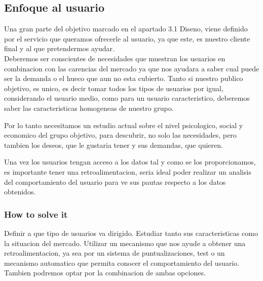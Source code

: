 \subsection{Enfoque al usuario}
Una gran parte del objetivo marcado en el apartado 3.1 Diseno, viene definido por el servicio que queramos ofrecerle
al usuario, ya que este, es nuestro cliente final y al que pretendermos ayudar.\\


Deberemos ser conscientes de necesidades que muestran los usuarios en combinacion con las carencias del mercado ya que
nos ayudara a saber cual puede ser la demanda o el hueco que aun no esta cubierto.
Tanto si nuestro publico objetivo, es unico, es decir tomar todos los tipos de usuarios por igual, considerando el 
usuario medio, como para un usuario caracteristico, deberemos saber las caracteristicas homogeneas de nuestro grupo.

Por lo tanto necesitamos un estudio actual sobre el nivel psicologico, social y economico del grupo objetivo, para descubrir, no solo
las necesidades, pero tambien los deseos, que le gustaria tener y sus demandas, que quieren.

Una vez los usuarios tengan acceso a los datos tal y como se los proporcionamos, es importante tener una retroalimentacion, 
seria ideal poder realizar un analisis del comportamiento del usuario para ve sus pautas respecto a los datos obtenidos.

\subsubsection{How to solve it} 
Definir a que tipo de usuarios va dirigido. Estudiar tanto sus caracteristicas como la situacion del
mercado.
Utilizar un mecanismo que nos ayude a obtener una retroalimentacion, ya sea por un sistema de puntualizaciones, test o
un mecanismo automatico que permita conocer el comportamiento del usuario. Tambien podremos optar por la combinacion de ambas 
opciones.

